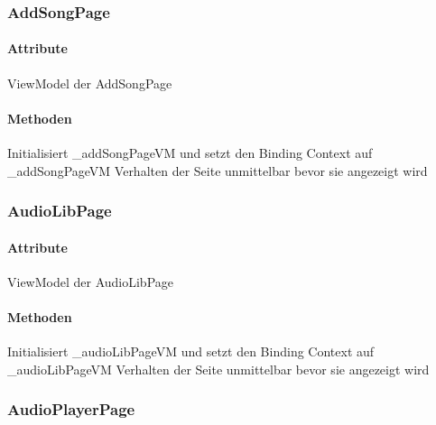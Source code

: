 \documentclass[../entwurf.tex]{subfiles}
\begin{document}
\subsubsection{AddSongPage}

\paragraph{Attribute}
\begin{itemize}
	 ViewModel der AddSongPage
\end{itemize}

\paragraph{Methoden}
\begin{itemize}
	 Initialisiert \_addSongPageVM und setzt den Binding Context 			auf \_addSongPageVM
	 Verhalten der Seite unmittelbar bevor sie angezeigt wird
\end{itemize}

\subsubsection{AudioLibPage}

\paragraph{Attribute}
\begin{itemize}
	 ViewModel der AudioLibPage
\end{itemize}

\paragraph{Methoden}
\begin{itemize}
	 Initialisiert \_audioLibPageVM und setzt den Binding Context 			auf \_audioLibPageVM
	 Verhalten der Seite unmittelbar bevor sie angezeigt wird
\end{itemize}

\subsubsection{AudioPlayerPage}
\end{document}
